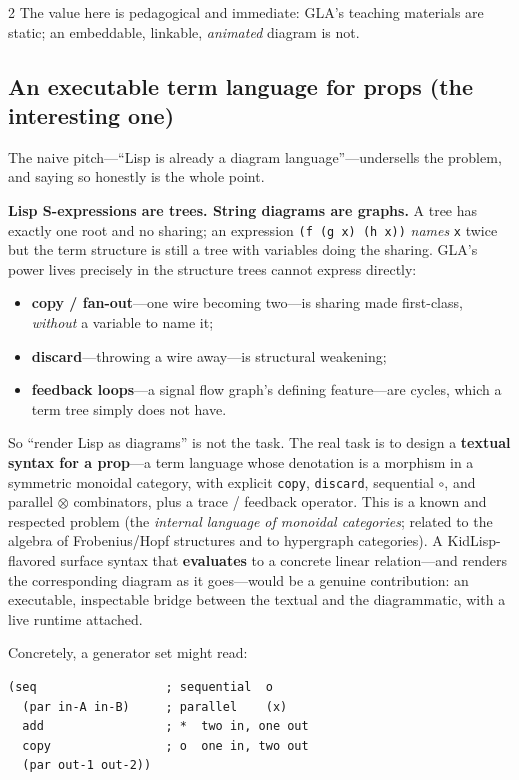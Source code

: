 \documentclass[11pt, letterpaper]{article}
\begin{document}
\begin{multicols}{2}
The value here is pedagogical and immediate: GLA's teaching materials are
static; an embeddable, linkable, \emph{animated} diagram is not.

\subsection{An executable term language for props (the interesting one)}

The naive pitch---``Lisp is already a diagram language''---undersells the
problem, and saying so honestly is the whole point.

\textbf{Lisp S-expressions are trees. String diagrams are graphs.} A tree
has exactly one root and no sharing; an expression \texttt{(f (g x) (h
x))} \emph{names} \texttt{x} twice but the term structure is still a tree
with variables doing the sharing. GLA's power lives precisely in the
structure trees cannot express directly:

\begin{itemize}
  \item \textbf{copy / fan-out}---one wire becoming two---is sharing made
    first-class, \emph{without} a variable to name it;
  \item \textbf{discard}---throwing a wire away---is structural weakening;
  \item \textbf{feedback loops}---a signal flow graph's defining
    feature---are cycles, which a term tree simply does not have.
\end{itemize}

So ``render Lisp as diagrams'' is not the task. The real task is to design
a \textbf{textual syntax for a prop}---a term language whose denotation is
a morphism in a symmetric monoidal category, with explicit \texttt{copy},
\texttt{discard}, sequential $\circ$, and parallel $\otimes$ combinators,
plus a trace / feedback operator. This is a known and respected problem
(the \emph{internal language of monoidal categories}; related to the
algebra of Frobenius/Hopf structures and to hypergraph categories). A
KidLisp-flavored surface syntax that \textbf{evaluates} to a concrete
linear relation---and renders the corresponding diagram as it goes---would
be a genuine contribution: an executable, inspectable bridge between the
textual and the diagrammatic, with a live runtime attached.

Concretely, a generator set might read:

\begin{lstlisting}[style=kidlisp]
(seq                  ; sequential  o
  (par in-A in-B)     ; parallel    (x)
  add                 ; *  two in, one out
  copy                ; o  one in, two out
  (par out-1 out-2))
\end{lstlisting}


\end{multicols}
\end{document}
